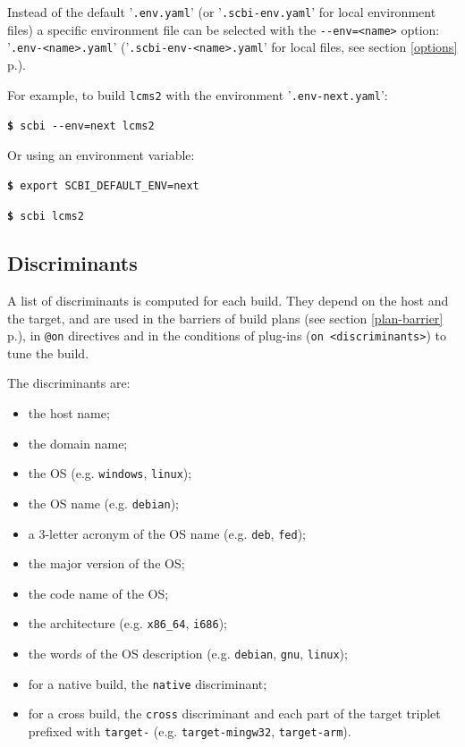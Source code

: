 \documentclass[a4paper,12pt,twoside]{article}
\newcommand{\code}[1]{\texttt{#1}}
\newcommand{\seeref}[1]{see section \ref{#1} p.\pageref{#1}}
\newcommand{\file}[1]{'{\texttt{#1}}'}
\newcommand{\cmd}[1]{\tabto{1cm}\hspace{0.5cm}\texttt{\textbf{\$} #1}}
\newcommand{\ddash}{-{}-}
\begin{document}
Instead of the default \file{.env.yaml} (or \file{.scbi-env.yaml} for local environment files) a specific environment file can be selected with the \code{\ddash{}env=<name>} option: \file{.env-<name>.yaml} (\file{.scbi-env-<name>.yaml} for local files, \seeref{options}).

For example, to build \code{lcms2} with the environment \file{.env-next.yaml}:

\cmd{scbi \ddash{}env=next lcms2}

Or using an environment variable:

\cmd{export SCBI\_DEFAULT\_ENV=next}

\cmd{scbi lcms2}

\subsection{Discriminants}
\label{discriminants}

A list of discriminants is computed for each build. They depend on the host and the target, and are used in the barriers of build plans (\seeref{plan-barrier}), in \code{@on} directives and in the conditions of plug-ins (\code{on <discriminants>}) to tune the build.

The discriminants are:

\begin{itemize}
	\item the host name;
	\item the domain name;
	\item the OS (e.g. \code{windows}, \code{linux});
	\item the OS name (e.g. \code{debian});
	\item a 3-letter acronym of the OS name (e.g. \code{deb}, \code{fed});
	\item the major version of the OS;
	\item the code name of the OS;
	\item the architecture (e.g. \code{x86\_64}, \code{i686});
	\item the words of the OS description (e.g. \code{debian}, \code{gnu}, \code{linux});
	\item for a native build, the \code{native} discriminant;
	\item for a cross build, the \code{cross} discriminant and each part of the target triplet prefixed with \code{target-} (e.g. \code{target-mingw32}, \code{target-arm}).
\end{itemize}
\end{document}
